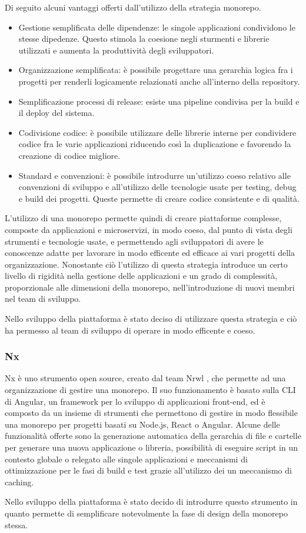 Di seguito alcuni vantaggi offerti dall'utilizzo della strategia monorepo.\cite{Monorepo}
\begin{itemize}
    \item Gestione semplificata delle dipendenze: le singole applicazioni condividono le stesse dipedenze.
          Questo stimola la coesione negli sturmenti e librerie utilizzati e
          aumenta la produttività degli sviluppatori.
    \item Organizzazione semplificata: è possibile progettare una
          gerarchia logica fra i progetti per renderli logicamente
          relazionati anche all'interno della repository.
    \item Semplificazione processi di release: esiste una pipeline condivisa per la build e il deploy del sistema.
    \item Codivisione codice: è possibile utilizzare delle librerie interne per condividere codice fra le varie applicazioni riducendo
          così la duplicazione e favorendo la creazione di codice migliore.
    \item Standard e convenzioni: è possibile introdurre un'utilizzo coeso relativo alle convenzioni di sviluppo e all'utilizzo delle tecnologie
          usate per testing, debug e build dei progetti. Queste permette di creare codice consistente e di qualità.

\end{itemize}
L'utilizzo di una monorepo permette quindi di creare piattaforme complesse, composte da applicazioni e microservizi, in modo
coeso, dal punto di vista degli strumenti e tecnologie usate, e permettendo agli sviluppatori di avere le conoscenze adatte per lavorare
in modo efficente ed efficace ai vari progetti della organizzazione.
Nonostante ciò l'utilizzo di questa strategia introduce un certo livello di rigidità nella gestione delle applicazioni e un
grado di complessità, proporzionale alle dimensioni della monorepo, nell'introduzione di nuovi membri nel team di sviluppo.

Nello sviluppo della piattaforma è stato deciso di utilizzare questa strategia e ciò ha permesso
al team di sviluppo di operare in modo efficente e coeso.

\subsubsection{Nx}
Nx \cite{Nx} è uno strumento open source, creato dal team Nrwl \cite{Nrwl}, che permette ad una organizzazione
di gestire una monorepo.
Il suo funzionamento è basato sulla CLI di Angular, un framework per lo sviluppo di applicazioni front-end,
ed è composto da un insieme di strumenti che permettono di gestire in modo flessibile una monorepo per progetti basati
su Node.js, React o Angular. Alcune delle funzionalità offerte sono la generazione automatica della gerarchia di file e cartelle
per generare una nuova applicazione o libreria, possibilità di eseguire script in un contesto globale o relegato alle singole applicazioni
e meccanismi di ottimizzazione per le fasi di build e test grazie all'utilizzo dei un meccanismo di caching.

Nello sviluppo della piattaforma è stato decido di introdurre questo strumento in quanto permette di semplificare
notevolmente la fase di design della monorepo stessa.